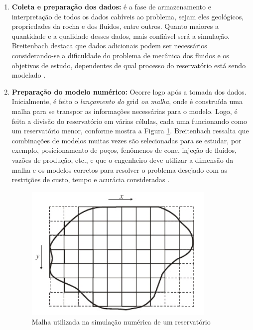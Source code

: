 \begin{enumerate}
\item \textbf{Coleta e prepara\c{c}\~{a}o dos dados:} \'{e} a fase de armazenamento e interpreta\c{c}\~{a}o de todos os dados cab\'{i}veis ao problema, sejam eles geol\'{o}gicos, propriedades da rocha e dos fluidos, entre outros. Quanto maiores a quantidade e a qualidade desses dados, mais confi\'{a}vel ser\'{a} a simula\c{c}\~{a}o. Breitenbach destaca que dados adicionais podem ser necess\'{a}rios considerando-se a dificuldade do problema de mec\^{a}nica dos fluidos e os objetivos de estudo, dependentes de qual processo do reservat\'{o}rio est\'{a} sendo modelado \cite{breitenbach1991}.
\item \textbf{Prepara\c{c}\~{a}o do modelo num\'{e}rico:} Ocorre logo ap\'{o}s a tomada dos dados. Inicialmente, \'{e} feito o \textit{lan\c{c}amento do} grid \textit{ou malha}, onde \'{e} constru\'{i}da uma malha para se transpor as informa\c{c}\~{o}es necess\'{a}rias para o modelo. Logo, \'{e} feita a divis\~{a}o do reservat\'{o}rio em v\'{a}rias c\'{e}lulas, cada uma funcionando como um reservat\'{o}rio menor, conforme mostra a Figura \ref{fig:revisao_simsec3}. Breitenbach ressalta que combina\c{c}\~{o}es de modelos muitas vezes s\~{a}o selecionadas para se estudar, por exemplo, posicionamento de po\c{c}os, fen\^{o}menos de cone, inje\c{c}\~{a}o de fluidos, vaz\~{o}es de produ\c{c}\~{a}o, etc., e que o engenheiro deve utilizar a dimens\~{a}o da malha e os modelos corretos para resolver o problema desejado com as restri\c{c}\~{o}es de custo, tempo e acur\'{a}cia consideradas \cite{breitenbach1991}.
\begin{figure}[H]
	\centering
	\includegraphics[width=.5\textwidth]{figs/revisao/revisao_simsec3}
	\caption{Malha utilizada na simula\c{c}\~{a}o num\'{e}rica de um reservat\'{o}rio \cite[p. 524]{engres}}
	\label{fig:revisao_simsec3}
\end{figure}

\end{enumerate}

